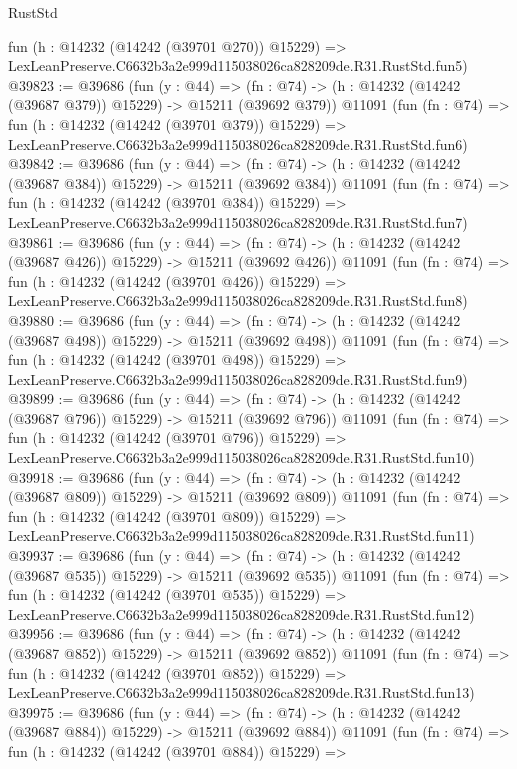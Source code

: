 \begin{lexlean}{RustStd}
\begin{coremodule}
    fun (h : @14232 (@14242 (@39701 @270)) @15229) =>
    LexLeanPreserve.C6632b3a2e999d115038026ca828209de.R31.RustStd.fun5)
@39823 := @39686
    (fun (y : @44) =>
    (fn : @74) -> (h : @14232 (@14242 (@39687 @379)) @15229) -> @15211 (@39692 @379))
    @11091
    (fun (fn : @74) =>
    fun (h : @14232 (@14242 (@39701 @379)) @15229) =>
    LexLeanPreserve.C6632b3a2e999d115038026ca828209de.R31.RustStd.fun6)
@39842 := @39686
    (fun (y : @44) =>
    (fn : @74) -> (h : @14232 (@14242 (@39687 @384)) @15229) -> @15211 (@39692 @384))
    @11091
    (fun (fn : @74) =>
    fun (h : @14232 (@14242 (@39701 @384)) @15229) =>
    LexLeanPreserve.C6632b3a2e999d115038026ca828209de.R31.RustStd.fun7)
@39861 := @39686
    (fun (y : @44) =>
    (fn : @74) -> (h : @14232 (@14242 (@39687 @426)) @15229) -> @15211 (@39692 @426))
    @11091
    (fun (fn : @74) =>
    fun (h : @14232 (@14242 (@39701 @426)) @15229) =>
    LexLeanPreserve.C6632b3a2e999d115038026ca828209de.R31.RustStd.fun8)
@39880 := @39686
    (fun (y : @44) =>
    (fn : @74) -> (h : @14232 (@14242 (@39687 @498)) @15229) -> @15211 (@39692 @498))
    @11091
    (fun (fn : @74) =>
    fun (h : @14232 (@14242 (@39701 @498)) @15229) =>
    LexLeanPreserve.C6632b3a2e999d115038026ca828209de.R31.RustStd.fun9)
@39899 := @39686
    (fun (y : @44) =>
    (fn : @74) -> (h : @14232 (@14242 (@39687 @796)) @15229) -> @15211 (@39692 @796))
    @11091
    (fun (fn : @74) =>
    fun (h : @14232 (@14242 (@39701 @796)) @15229) =>
    LexLeanPreserve.C6632b3a2e999d115038026ca828209de.R31.RustStd.fun10)
@39918 := @39686
    (fun (y : @44) =>
    (fn : @74) -> (h : @14232 (@14242 (@39687 @809)) @15229) -> @15211 (@39692 @809))
    @11091
    (fun (fn : @74) =>
    fun (h : @14232 (@14242 (@39701 @809)) @15229) =>
    LexLeanPreserve.C6632b3a2e999d115038026ca828209de.R31.RustStd.fun11)
@39937 := @39686
    (fun (y : @44) =>
    (fn : @74) -> (h : @14232 (@14242 (@39687 @535)) @15229) -> @15211 (@39692 @535))
    @11091
    (fun (fn : @74) =>
    fun (h : @14232 (@14242 (@39701 @535)) @15229) =>
    LexLeanPreserve.C6632b3a2e999d115038026ca828209de.R31.RustStd.fun12)
@39956 := @39686
    (fun (y : @44) =>
    (fn : @74) -> (h : @14232 (@14242 (@39687 @852)) @15229) -> @15211 (@39692 @852))
    @11091
    (fun (fn : @74) =>
    fun (h : @14232 (@14242 (@39701 @852)) @15229) =>
    LexLeanPreserve.C6632b3a2e999d115038026ca828209de.R31.RustStd.fun13)
@39975 := @39686
    (fun (y : @44) =>
    (fn : @74) -> (h : @14232 (@14242 (@39687 @884)) @15229) -> @15211 (@39692 @884))
    @11091
    (fun (fn : @74) =>
    fun (h : @14232 (@14242 (@39701 @884)) @15229) =>

\end{coremodule}
\end{lexlean}
